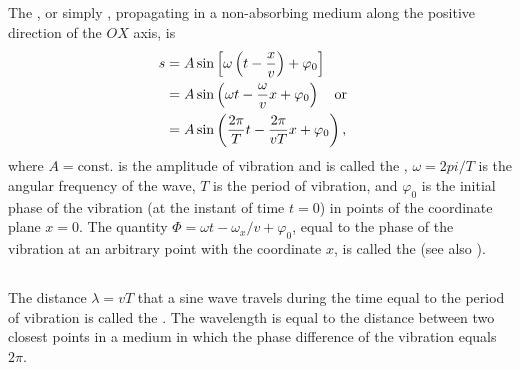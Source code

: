 \subsection{}\label{30.2.5} The , or simply , propagating in a non-absorbing medium along the positive direction of the $OX$ axis, is
\begin{align*}%
s & = A \sin \left[ \omega \left( t - \frac{x}{v} \right) + \varphi_{0} \right] \\
& =  A \sin \left(  \omega t - \frac{ \omega}{v}x  + \varphi_{0} \right) \qor \\
& =  A \sin \left(  \frac{2\pi}{T} t - \frac{2 \pi}{vT}x  + \varphi_{0} \right),
\end{align*}
where $A = \text{const.}$ is the amplitude of vibration and is called the , $\omega = 2pi/T$ is the angular frequency of the wave, $T$ is the period of vibration, and $\varphi_{0}$ is the initial phase of the vibration (at the instant of time $t = 0$) in points of the coordinate plane $x = 0$. The quantity $\Phi = \omega t - \omega_{x}/v + \varphi_{0}$, equal to the phase of the vibration at an arbitrary point with the coordinate $x$, is called the  (see also ). 

\subsection{}\label{30.2.6} The distance $\lambda = vT$ that a sine wave travels during the time equal to the period of vibration is called the . The wavelength is equal to the distance between two closest points in a medium in which the phase difference of the vibration equals $2\pi$.

